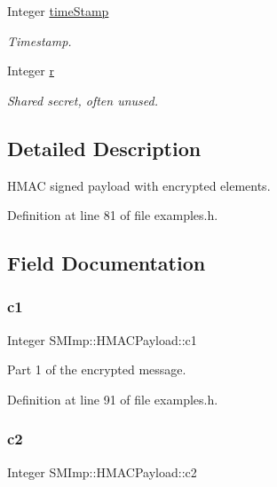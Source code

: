 \begin{DoxyCompactItemize}
Integer \hyperlink{structSMImp_1_1HMACPayload_abf2b3077546fcf168ee7e0fe80a08b40}{time\+Stamp}
\begin{DoxyCompactList}\small\item\em Timestamp. \end{DoxyCompactList}\item 
Integer \hyperlink{structSMImp_1_1HMACPayload_a6829ee16dbd13177fdbca12b6e52a75b}{r}
\begin{DoxyCompactList}\small\item\em Shared secret, often unused. \end{DoxyCompactList}\end{DoxyCompactItemize}


\subsection{Detailed Description}
H\+M\+AC signed payload with encrypted elements. 

Definition at line 81 of file examples.\+h.



\subsection{Field Documentation}
\mbox{\label{structSMImp_1_1HMACPayload_aa28e06eeacc346a1add298357a8b7fb9}} 
\subsubsection{\texorpdfstring{c1}{c1}}
{\footnotesize\ttfamily Integer S\+M\+Imp\+::\+H\+M\+A\+C\+Payload\+::c1}



Part 1 of the encrypted message. 



Definition at line 91 of file examples.\+h.

\mbox{\label{structSMImp_1_1HMACPayload_aeb2e7ef7dfeda975882a42aab9c0652f}} 
\subsubsection{\texorpdfstring{c2}{c2}}
{\footnotesize\ttfamily Integer S\+M\+Imp\+::\+H\+M\+A\+C\+Payload\+::c2}



